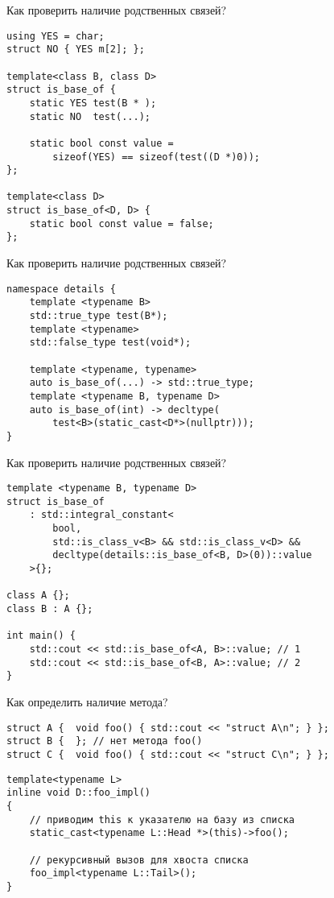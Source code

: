 \documentclass{beamer}
\begin{document}
\begin{frame}[fragile]{Как проверить наличие родственных связей?}
\small
\begin{lstlisting}
using YES = char;
struct NO { YES m[2]; };

template<class B, class D>
struct is_base_of {
    static YES test(B * );
    static NO  test(...);
    
    static bool const value = 
        sizeof(YES) == sizeof(test((D *)0));
};

template<class D> 
struct is_base_of<D, D> {
    static bool const value = false;
};
\end{lstlisting}
\end{frame}

\begin{frame}[fragile]{Как проверить наличие родственных связей?}
\small
\begin{lstlisting}
namespace details {
    template <typename B>
    std::true_type test(B*);
    template <typename>
    std::false_type test(void*);
 
    template <typename, typename>
    auto is_base_of(...) -> std::true_type;
    template <typename B, typename D>
    auto is_base_of(int) -> decltype(
        test<B>(static_cast<D*>(nullptr)));
}
\end{lstlisting}
\end{frame}

\begin{frame}[fragile]{Как проверить наличие родственных связей?}
\small
\begin{lstlisting}
template <typename B, typename D>
struct is_base_of
    : std::integral_constant<
        bool,
        std::is_class_v<B> && std::is_class_v<D> &&
        decltype(details::is_base_of<B, D>(0))::value
    >{};

class A {};
class B : A {};
 
int main() {
    std::cout << std::is_base_of<A, B>::value; // 1
    std::cout << std::is_base_of<B, A>::value; // 2
}
\end{lstlisting}
\end{frame}


\begin{frame}[fragile]{Как определить наличие метода?}
\begin{lstlisting}
struct A {  void foo() { std::cout << "struct A\n"; } };
struct B {  }; // нет метода foo()
struct C {  void foo() { std::cout << "struct C\n"; } };
\end{lstlisting}

\begin{lstlisting}
template<typename L> 
inline void D::foo_impl() 
{
    // приводим this к указателю на базу из списка
    static_cast<typename L::Head *>(this)->foo();
    
    // рекурсивный вызов для хвоста списка
    foo_impl<typename L::Tail>();
}
\end{lstlisting}
\end{frame}
\end{document}
